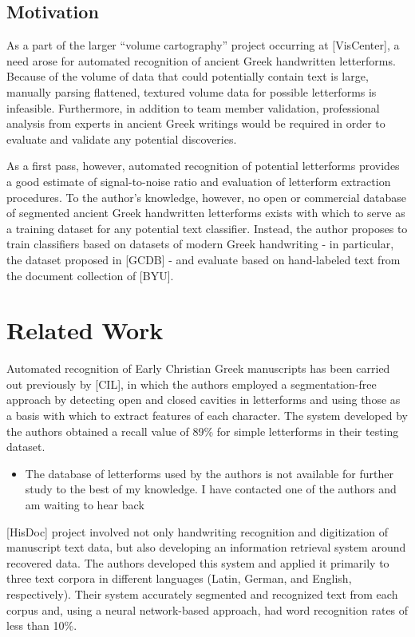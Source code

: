 \documentclass[10pt,twocolumn,letterpaper]{article}
\begin{document}
\subsection{Motivation}

As a part of the larger “volume cartography” project occurring at [VisCenter], a need arose for automated recognition of ancient Greek handwritten letterforms.  Because of the volume of data that could potentially contain text is large, manually parsing flattened, textured volume data for possible letterforms is infeasible. Furthermore, in addition to team member validation, professional analysis from experts in ancient Greek writings would be required in order to evaluate and validate any potential discoveries.

As a first pass, however, automated recognition of potential letterforms provides a good estimate of signal-to-noise ratio and evaluation of letterform extraction procedures. To the author’s knowledge, however, no open or commercial database of segmented ancient Greek handwritten letterforms exists with which to serve as a training dataset for any potential text classifier. Instead, the author proposes to train classifiers based on datasets of modern Greek handwriting - in particular, the dataset proposed in [GCDB] - and evaluate based on hand-labeled text from the document collection of [BYU].

\section{Related Work}

Automated recognition of Early Christian Greek manuscripts has been carried out previously by [CIL], in which the authors employed a segmentation-free approach by detecting open and closed cavities in letterforms and using those as a basis with which to extract features of each character. The system developed by the authors obtained a recall value of 89\% for simple letterforms in their testing dataset.
\begin{itemize}
    \item The database of letterforms used by the authors is not available for further study to the best of my knowledge. I have contacted one of the authors and am waiting to hear back
\end{itemize}

[HisDoc] project involved not only handwriting recognition and digitization of manuscript text data, but also developing an information retrieval system around recovered data. The authors developed this system and applied it primarily to three text corpora in different languages (Latin, German, and English, respectively). Their system accurately segmented and recognized text from each corpus and, using a neural network-based approach, had word recognition rates of less than 10\%.
\end{document}
